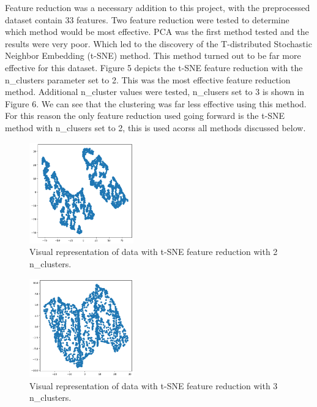 \documentclass[twocolumn]{article}
\begin{document}
Feature reduction was a necessary addition to this project, with the preprocessed dataset contain 33 features. Two feature reduction were tested to determine which method would be most effective. PCA was the first method tested and the results were very poor. Which led to the discovery of the T-distributed Stochastic Neighbor Embedding (t-SNE) method. This method turned out to be far more effective for this dataset. Figure 5 depicts the t-SNE feature reduction with the n\_clusters parameter set to 2. This was the most effective feature reduction method. Additional n\_cluster values were tested, n\_clusers set to 3 is shown in Figure 6. We can see that the clustering was far less effective using this method. For this reason the only feature reduction used going forward is the t-SNE method with n\_clusers set to 2, this is used acorss all methods discussed below.

\begin{figure}[H]
    \centering
    \includegraphics[width=0.4\textwidth]{images/tsne_2.png}
    \caption{Visual representation of data with t-SNE feature reduction with 2 n\_clusters.}
\end{figure}



\begin{figure}[H]
    \centering
    \includegraphics[width=0.4\textwidth]{images/tsne_3.png}
    \caption{Visual representation of data with t-SNE feature reduction with 3 n\_clusters.}
\end{figure}
\end{document}
